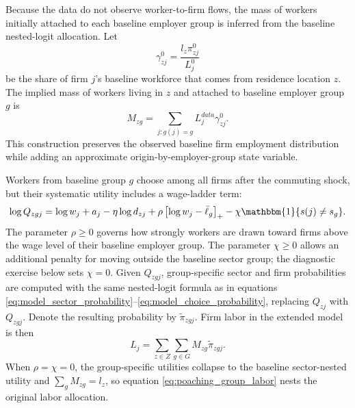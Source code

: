 \documentclass[12pt]{article}
\begin{document}
Because the data do not observe worker-to-firm flows, the mass of workers initially attached to each baseline employer group is inferred from the baseline nested-logit allocation. Let
\begin{equation}
    \gamma^0_{zj}
    =
    \frac{l_z\pi^0_{zj}}{L^0_j}
    \label{eq:baseline_origin_firm_share}
\end{equation}
be the share of firm \(j\)'s baseline workforce that comes from residence location \(z\). The implied mass of workers living in \(z\) and attached to baseline employer group \(g\) is
\begin{equation}
    M_{zg}
    =
    \sum_{j:g(j)=g}
    L_j^{data}\gamma^0_{zj}.
    \label{eq:baseline_group_mass}
\end{equation}
This construction preserves the observed baseline firm employment distribution while adding an approximate origin-by-employer-group state variable.

Workers from baseline group \(g\) choose among all firms after the commuting shock, but their systematic utility includes a wage-ladder term:
\begin{equation}
    \log Q_{zgj}
    =
    \log w_j
    +
    a_j
    -
    \eta\log d_{zj}
    +
    \rho\left[\log w_j-\bar{\ell}_g\right]_+
    -
    \chi\mathbbm{1}\{s(j)\neq s_g\}.
    \label{eq:poaching_group_attractiveness}
\end{equation}
The parameter \(\rho\geq 0\) governs how strongly workers are drawn toward firms above the wage level of their baseline employer group. The parameter \(\chi\geq 0\) allows an additional penalty for moving outside the baseline sector group; the diagnostic exercise below sets \(\chi=0\). Given \(Q_{zgj}\), group-specific sector and firm probabilities are computed with the same nested-logit formula as in equations \eqref{eq:model_sector_probability}--\eqref{eq:model_choice_probability}, replacing \(Q_{zj}\) with \(Q_{zgj}\). Denote the resulting probability by \(\widetilde{\pi}_{zgj}\). Firm labor in the extended model is then
\begin{equation}
    L_j
    =
    \sum_{z\in Z}\sum_{g\in G}
    M_{zg}\widetilde{\pi}_{zgj}.
    \label{eq:poaching_group_labor}
\end{equation}
When \(\rho=\chi=0\), the group-specific utilities collapse to the baseline sector-nested utility and \(\sum_g M_{zg}=l_z\), so equation \eqref{eq:poaching_group_labor} nests the original labor allocation.
\end{document}

